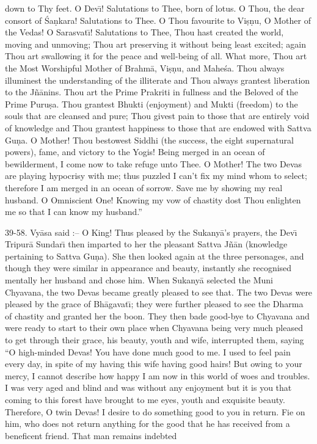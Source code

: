 down to Thy feet. O Dev\={\i}! Salutations to Thee, born of lotus. O Thou, the dear consort of \'Sa\d{n}kara! Salutations to Thee. O Thou favourite to Vi\d{s}\d{n}u, O Mother of the Vedas! O Sarasvat\={\i}! Salutations to Thee, Thou hast created the world, moving and unmoving; Thou art preserving it without being least excited; again Thou art swallowing it for the peace and well-being of all. What more, Thou art the Most Worshipful Mother of Brahm\=a, Vi\d{s}\d{n}u, and Mahe\'sa. Thou always illuminest the understanding of the illiterate and Thou always grantest liberation to the J\~n\=anins. Thou art the Prime Prakriti in fullness and the Beloved of the Prime Puru\d{s}a. Thou grantest Bhukti (enjoyment) and Mukti (freedom) to the souls that are cleansed and pure; Thou givest pain to those that are entirely void of knowledge and Thou grantest happiness to those that are endowed with Sattva Gu\d{n}a. O Mother! Thou bestowest Siddhi (the success, the eight supernatural powers), fame, and victory to the Yogis! Being merged in an ocean of bewilderment, I come now to take refuge unto Thee. O Mother! The two Devas are playing hypocrisy with me; thus puzzled I can't fix my mind whom to select; therefore I am merged in an ocean of sorrow. Save me by showing my real husband. O Omniscient One! Knowing my vow of chastity dost Thou enlighten me so that I can know my husband.''

39-58. Vy\=asa said :-- O King! Thus pleased by the Sukany\=a's prayers, the Dev\={\i} Tripur\=a Sundar\={\i} then imparted to her the pleasant Sattva J\~n\=an (knowledge pertaining to Sattva Gu\d{n}a). She then looked again at the three personages, and though they were similar in appearance and beauty, instantly she recognised mentally her husband and chose him. When Sukany\=a selected the Muni Chyavana, the two Devas became greatly pleased to see that. The two Devas were pleased by the grace of Bh\=agavat\={\i}; they were further pleased to see the Dharma of chastity and granted her the boon. They then bade good-bye to Chyavana and were ready to start to their own place when Chyavana being very much pleased to get through their grace, his beauty, youth and wife, interrupted them, saying ``O high-minded Devas! You have done much good to me. I used to feel pain every day, in spite of my having this wife having good hairs! But owing to your mercy, I cannot describe how happy I am now in this world of woes and troubles. I was very aged and blind and was without any enjoyment but it is you that coming to this forest have brought to me eyes, youth and exquisite beauty. Therefore, O twin Devas! I desire to do something good to you in return. Fie on him, who does not return anything for the good that he has received from a beneficent friend. That man remains indebted

